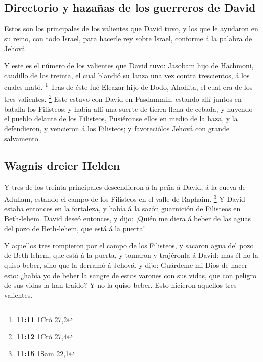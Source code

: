 \hypertarget{directorio-y-hazauxf1as-de-los-guerreros-de-david}{%
\subsection{Directorio y hazañas de los guerreros de
David}\label{directorio-y-hazauxf1as-de-los-guerreros-de-david}}

 Estos son los principales de los valientes que David tuvo,
y los que le ayudaron en su reino, con todo Israel, para hacerle rey
sobre Israel, conforme á la palabra de Jehová.

 Y este es el número de los valientes que David tuvo:
Jasobam hijo de Hachmoni, caudillo de los treinta, el cual blandió su
lanza una vez contra trescientos, á los cuales mató. \footnote{\textbf{11:11}
  1Cró 27,2}  Tras de éste fué Eleazar hijo de Dodo,
Ahohita, el cual era de los tres valientes. \footnote{\textbf{11:12}
  1Cró 27,4}  Este estuvo con David en Pasdammin, estando
allí juntos en batalla los Filisteos: y había allí una suerte de tierra
llena de cebada, y huyendo el pueblo delante de los Filisteos,
 Pusiéronse ellos en medio de la haza, y la defendieron, y
vencieron á los Filisteos; y favoreciólos Jehová con grande salvamento.

\hypertarget{wagnis-dreier-helden}{%
\subsection{Wagnis dreier Helden}\label{wagnis-dreier-helden}}

 Y tres de los treinta principales descendieron á la peña á
David, á la cueva de Adullam, estando el campo de los Filisteos en el
valle de Raphaim. \footnote{\textbf{11:15} 1Sam 22,1}  Y
David estaba entonces en la fortaleza, y había á la sazón guarnición de
Filisteos en Beth-lehem.  David deseó entonces, y dijo:
¡Quién me diera á beber de las aguas del pozo de Beth-lehem, que está á
la puerta!

 Y aquellos tres rompieron por el campo de los Filisteos, y
sacaron agua del pozo de Beth-lehem, que está á la puerta, y tomaron y
trajéronla á David: mas él no la quiso beber, sino que la derramó á
Jehová, y dijo:  Guárdeme mi Dios de hacer esto: ¿había yo
de beber la sangre de estos varones con sus vidas, que con peligro de
sus vidas la han traído? Y no la quiso beber. Esto hicieron aquellos
tres valientes.


